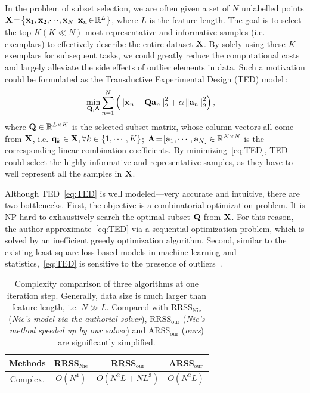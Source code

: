 \documentclass[a4paper]{article}
\providecommand{\tabularnewline}{\\}
\begin{document}
In the problem of subset selection, we are often given a set of $N$
unlabelled points $\mtbfX\!=\!\left\{ \mtbfx_{1},\mtbfx_{2},\!\cdots\!,\mtbfx_{N}\!\mid\!\mtbfx_{n}\!\in\!\mtbbR^{L}\right\} $,
where $L$ is the feature length. The goal is to select the top $K\left(K\!\ll\! N\right)$
most representative and informative samples (i.e. exemplars) to effectively
describe the entire dataset $\mathbf{X}$. By solely using these $K$
exemplars for subsequent tasks, we could greatly reduce the computational
costs and largely alleviate the side effects of outlier elements in
data. Such a motivation could be formulated as the Transductive Experimental
Design (TED) model\,\cite{kaiYu_2006_ICML_activeLearning}: 
\begin{align}
\min_{\mathbf{Q},\mathbf{A}} & \sum_{n=1}^{N}\left(\left\Vert \mathbf{x}_{n}-\mathbf{Q}\mathbf{a}_{n}\right\Vert _{2}^{2}+\alpha\left\Vert \mathbf{a}_{n}\right\Vert _{2}^{2}\right),\label{eq:TED}
\end{align}
where $\mathbf{Q}\in\mathbb{R}^{L\times K}$ is the selected subset matrix,
whose column vectors all come from $\mathbf{X}$, i.e. $\mathbf{q}_{k}\in\mathbf{X},\forall k\in\left\{ 1,\cdots,K\right\} $;
$\mathbf{A}\!=\!\left[\mathbf{a}_{1},\cdots,\mathbf{a}_{N}\right]\in\mathbb{R}^{K\times N}$
is the corresponding linear combination coefficients. By minimizing\ \eqref{eq:TED},
TED could select the highly informative and representative samples,
as they have to well represent all the samples in $\mathbf{X}$. 

Although TED\ \eqref{eq:TED} is well modeled---very accurate and
intuitive, there are two bottlenecks. First, the objective is a combinatorial
optimization problem. It is NP-hard to exhaustively search the optimal
subset $\mathbf{Q}$ from $\mathbf{X}$. For this reason, the author approximate\ \eqref{eq:TED}
via a sequential optimization problem, which is solved by an inefficient
greedy optimization algorithm. Second, similar to the existing least
square loss based models in machine learning and statistics,\ \eqref{eq:TED}
is sensitive to the presence of outliers\ \cite{huaWang_2014_ICML_RobustMetricLearning}.
\begin{table}[t]
\centering{}\caption{{\footnotesize{}}{\small{Complexity comparison of three algorithms
at one iteration step. Generally, data size is much larger than feature
length, i.e. $N\!\gg\! L$. Compared with RRSS$_{\text{Nie}}$ (}}\emph{\small{Nie's
model via the authorial solver}}{\small{), RRSS$_{\text{our}}$ (}}\emph{\small{Nie's
method speeded up by our solver}}{\small{) and ARSS$_{\text{our}}$
(}}\emph{\small{ours}}{\small{) are significantly simplified.\label{tab:complexity_3_methods}}}}
\begin{tabular}{|c|c|c|c|}
\hline 
Methods &
RRSS$_{\text{Nie}}$ &
RRSS$_{\text{our}}$ &
ARSS$_{\text{our}}$\tabularnewline
\hline 
Complex. &
$O\left(N^{4}\right)$ &
$O\left(N^{2}L+NL^{3}\right)$ &
$O\left(N^{2}L\right)$\tabularnewline
\hline 
\end{tabular}
\end{table}
\end{document}

